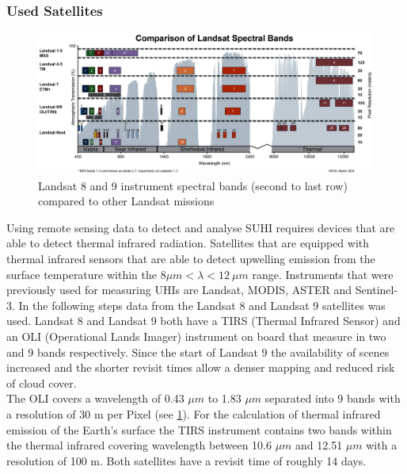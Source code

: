 \documentclass[12pt,a4paper, english,twoside]{article}
\begin{document}
    \subsubsection{Used Satellites}\label{sec:landsat}
      \begin{figure}[htbp]
       \begin{center}
         \includegraphics[width=\textwidth]{img/LandsatSpectralBands.png}
       \end{center}
       \caption{Landsat 8 and 9 instrument spectral bands (second to last row) compared to other Landsat missions\autocite{USGSWebsite}\label{fig:lsspectral}}
      \end{figure}
      \noindent
      Using remote sensing data to detect and analyse \gls{SUHI} requires devices that are able to detect thermal infrared radiation. 
      Satellites that are equipped with thermal infrared sensors that are able to detect upwelling emission from the surface temperature within the $ 8\mu m < \lambda < 12\ \mu m $ range. 
      Instruments that were previously used for measuring \glspl{UHI} are Landsat, MODIS, ASTER and Sentinel-3. 
      In the following steps data from the Landsat 8 and Landsat 9 satellites was used.%
      Landsat 8 and Landsat 9 both have a TIRS (Thermal Infrared Sensor) and an OLI (Operational Lands Imager) instrument on board that measure in two and 9 bands respectively.
      Since the start of Landsat 9 the availability of scenes increased and the shorter revisit times allow a denser mapping and reduced risk of cloud cover. \\ 
      The OLI covers a wavelength of 0.43 $\mu m$ to 1.83 $\mu m$ separated into 9 bands with a resolution of 30 m per Pixel (see \cref{fig:lsspectral}). 
      For the calculation of thermal infrared emission of the Earth's surface the TIRS instrument contains two bands within the thermal infrared covering wavelength between 10.6 $\mu m$ and 12.51 $\mu m$ with a resolution of 100 m.
      Both satellites have a revisit time of roughly 14 days. 
\end{document}
